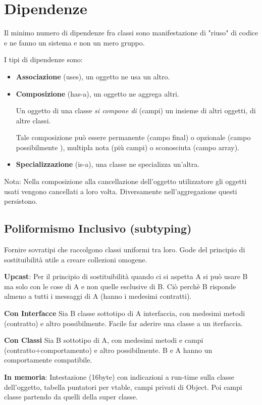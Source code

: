 \section{Dipendenze}
Il minimo numero di dipendenze fra classi sono manifestazione di "riuso" di codice e ne fanno un sistema e non un mero gruppo.

I tipi di dipendenze sono:
\begin{itemize}
	\item \textbf{Associazione} (uses),  un oggetto ne usa un altro.
	\item \textbf{Composizione} (has-a), un oggetto ne aggrega altri.

	Un oggetto di una classe \textit{si compone di} (campi) un insieme di altri oggetti, di altre classi.

	Tale composizione può essere permanente (campo final) o opzionale (campo possibilmente ), multipla nota (più campi) o sconosciuta (campo array).
	\item \textbf{Specializzazione} (is-a), una classe ne specializza un'altra.
\end{itemize}

Nota: Nella composizione alla cancellazione dell'oggetto utilizzatore gli oggetti usati vengono cancellati a loro volta. Diversamente nell'aggregazione questi persistono.




\subsection{Poliformismo Inclusivo (subtyping)}
Fornire sovratipi che raccolgono classi uniformi tra loro.
Gode del principio di sostituibilità utile a creare collezioni omogene.

\textbf{Upcast}: Per il principio di sostituibilità quando ci si aspetta A si può usare B ma solo con le cose di A e non quelle esclusive di B. Ciò perchè B risponde almeno a tutti i messaggi di A (hanno i medesimi contratti).
\medskip

\textbf{Con Interfacce}
Sia B classe sottotipo di A interfaccia, con medesimi metodi (contratto) e altro possibilmente. Facile far aderire una classe a un iterfaccia.
\medskip

\textbf{Con Classi}
Sia B sottotipo di A, con medesimi metodi e campi (contratto+comportamento) e altro possibilmente. B e A hanno un comportamente compatibile.

\textbf{In memoria}: Intestazione (16byte) con indicazioni a run-time sulla classe dell'oggetto, tabella puntatori per vtable, campi privati di Object. Poi campi classe partendo da quelli della super classe.
\bigskip


